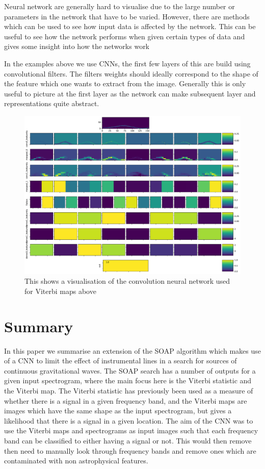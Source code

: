 Neural network are generally hard to visualise due to the large number or parameters in the network that have to be varied.
However, there are methods which can be used to see how input data is affected by the network.
This can be useful to see how the network performs when given certain types of data and gives some insight into how the networks work

In the examples above we use \acp{CNN}, the first few layers of this are build using convolutional filters.
The filters weights should ideally correspond to the shape of the feature which one wants to extract from the image. 
Generally this is only useful to picture at the first layer as the network can make subsequent layer and representations quite abstract.



\begin{figure}[h]
	\centering
	\includegraphics[width=\textwidth]{C4_cnn/vitmap_cnn_visualisation_signal.pdf}
	\caption{This shows a visualisation of the convolution neural network used for Viterbi maps above}
	\label{cnn:vis:vitmap:signal}
\end{figure}


\section{Summary}

In this paper we summarise an extension of the SOAP algorithm which makes use of a \ac{CNN} to limit the effect of instrumental lines in a search for sources of continuous gravitational waves.
The SOAP search has a number of outputs for a given input spectrogram, where the main focus here is the Viterbi statistic and the Viterbi map. 
The Viterbi statistic has previously been used as a measure of whether there is a signal in a given frequency band, and the Viterbi maps are images which have the same shape as the input spectrogram, but gives a likelihood that there is a signal in a given location. 
The aim of the \ac{CNN} was to use the Viterbi maps and spectrograms as input images such that each frequency band can be classified to either having a signal or not. 
This would then remove then need to manually look through frequency bands and remove ones which are contaminated with non astrophysical features. 

